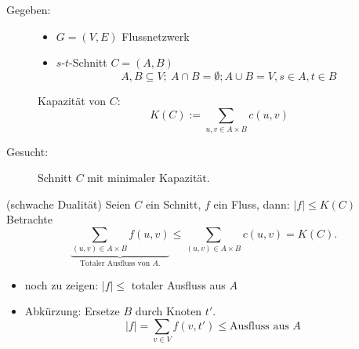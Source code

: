 \begin{description}
\item[Gegeben:]
    \begin{itemize}
    \item   $G = (V, E)$ Flussnetzwerk
    \item   $s$-$t$-Schnitt $C = (A,B)$
            \[A,B \subseteq V{;}\ A \cap B = \emptyset; A \cup B = V, s \in A, t \in B\]
    \end{itemize}
    Kapazität von $C$:
    \[K(C) := \sum\limits_{u,v \in A \times B} c(u,v)\]
\item[Gesucht:]
    Schnitt $C$ mit minimaler Kapazität.
\end{description}
\Lemma (schwache Dualität)
    Seien $C$ ein Schnitt, $f$ ein Fluss, dann: $|f| \leq K(C)$
\Bew Betrachte
    \[\underbrace{\sum\limits_{(u,v) \in A \times B} f(u,v)}_{\text{Totaler Ausfluss von $A$.}} \leq \sum\limits_{(u,v) \in A \times B} c(u,v) = K(C).\]
\begin{itemize}
\item   noch zu zeigen: $|f| \leq $ totaler Ausfluss aus $A$
\item   Abkürzung: Ersetze $B$ durch Knoten $t'$.
        \[|f| = \sum\limits_{v \in V} f(v,t') \leq \text{Ausfluss aus $A$}\]
\end{itemize}

    